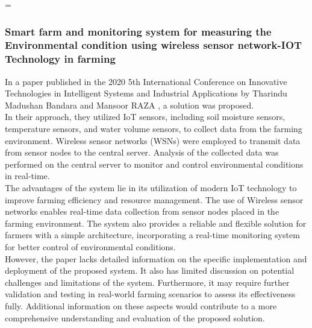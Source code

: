 =\documentclass[12pt, a4paper]{article}
\begin{document}
\subsubsection{Smart farm and monitoring system for measuring the Environmental condition using wireless sensor network-IOT Technology in farming}
In a paper published in the 2020 5th International Conference on Innovative Technologies in Intelligent Systems and Industrial Applications by Tharindu Madushan Bandara and Mansoor RAZA \cite{bandara2020smart}, a solution was proposed.\\
In their approach, they utilized IoT sensors, including soil moisture sensors, temperature sensors, and water volume sensors, to collect data from the farming environment. Wireless sensor networks (WSNs) were employed to transmit data from sensor nodes to the central server. Analysis of the collected data was performed on the central server to monitor and control environmental conditions in real-time.\\
The advantages of the system lie in its utilization of modern IoT technology to improve farming efficiency and resource management. The use of Wireless sensor networks enables real-time data collection from sensor nodes placed in the farming environment. The system also provides a reliable and flexible solution for farmers with a simple architecture, incorporating a real-time monitoring system for better control of environmental conditions.\\
However, the paper lacks detailed information on the specific implementation and deployment of the proposed system. It also has limited discussion on potential challenges and limitations of the system. Furthermore, it may require further validation and testing in real-world farming scenarios to assess its effectiveness fully. Additional information on these aspects would contribute to a more comprehensive understanding and evaluation of the proposed solution.\\
\end{document}
